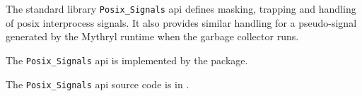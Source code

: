
The standard library {\tt Posix\_Signals} api defines 
masking, trapping and handling of posix interprocess signals.  It also provides similar handling 
for a pseudo-signal generated by the Mythryl runtime when the garbage collector 
runs.

The {\tt Posix\_Signals} api is implemented by the  package.

The {\tt Posix\_Signals} api source code is in .


